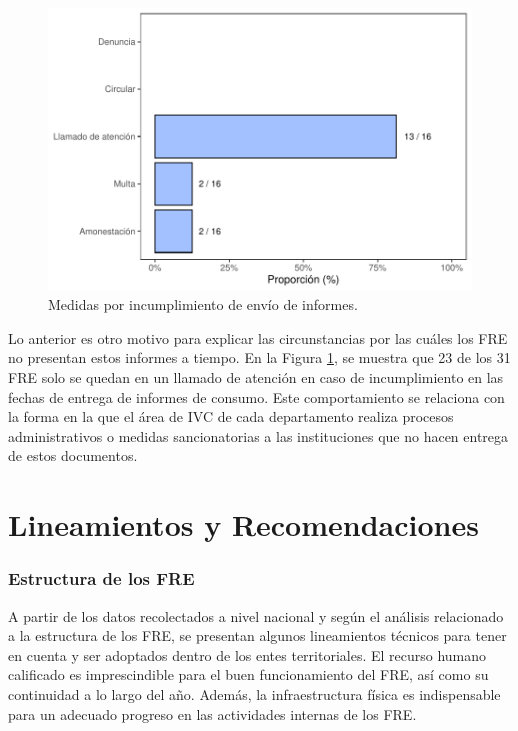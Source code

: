 \documentclass[
]{book}
\begin{document}
\begin{figure}[b!]

{\centering \includegraphics[width=0.9\linewidth]{InformeFinal_files/figure-latex/IncumplimientoEnvioInformes-1} 

}

\caption{Medidas por incumplimiento de envío de informes.}\label{fig:IncumplimientoEnvioInformes}
\end{figure}

Lo anterior es otro motivo para explicar las circunstancias por las cuáles los FRE no presentan estos informes a tiempo. En la Figura \ref{fig:IncumplimientoEnvioInformes}, se muestra que 23 de los 31 FRE solo se quedan en un llamado de atención en caso de incumplimiento en las fechas de entrega de informes de consumo. Este comportamiento se relaciona con la forma en la que el área de IVC de cada departamento realiza procesos administrativos o medidas sancionatorias a las instituciones que no hacen entrega de estos documentos.

\hypertarget{lineamientos-y-recomendaciones}{%
\chapter{Lineamientos y Recomendaciones}\label{lineamientos-y-recomendaciones}}

\hypertarget{estructura-de-los-fre}{%
\subsection{Estructura de los FRE}\label{estructura-de-los-fre}}

A partir de los datos recolectados a nivel nacional y según el análisis relacionado a la estructura de los FRE, se presentan algunos lineamientos técnicos para tener en cuenta y ser adoptados dentro de los entes territoriales. El recurso humano calificado es imprescindible para el buen funcionamiento del FRE, así como su continuidad a lo largo del año. Además, la infraestructura física es indispensable para un adecuado progreso en las actividades internas de los FRE.
\end{document}
